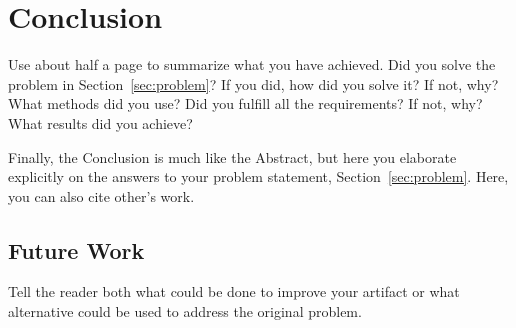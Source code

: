 \chapter{Conclusion}
\label{chap:conclusion}
\begin{instructions}
Use about half a page to summarize what you have achieved. Did you solve the problem in Section~\ref{sec:problem}? If you did, how did you solve it? If not, why? What methods did you use? Did you fulfill all the requirements? If not, why? What results did you achieve?

Finally, the Conclusion is much like the Abstract, but here you elaborate explicitly on the answers to your problem statement, Section~\ref{sec:problem}. Here, you can also cite other’s work.
\end{instructions}

\section{Future Work}
\label{sec:future}
\begin{instructions}
Tell the reader both what could be done to improve your artifact or what alternative could be used to address the original problem.
\end{instructions}
